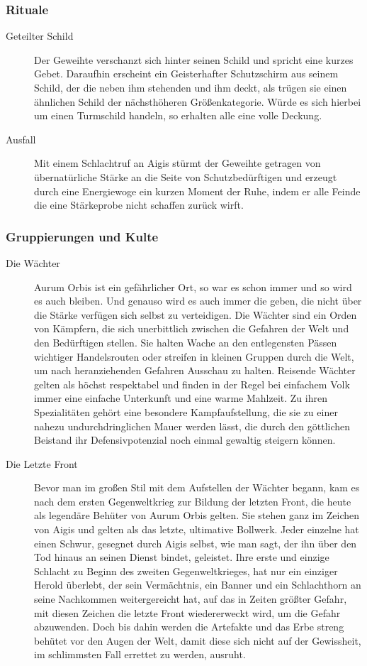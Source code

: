 \documentclass[a4paper,12pt,oneside]{book}
\begin{document}
\subsubsection{Rituale}
\begin{description}
\item[Geteilter Schild]
Der Geweihte verschanzt sich hinter seinen Schild und spricht eine kurzes Gebet. Daraufhin erscheint ein Geisterhafter Schutzschirm aus seinem Schild, der die neben ihm stehenden und ihm deckt, als trügen sie einen ähnlichen Schild der nächsthöheren Größenkategorie. Würde es sich hierbei um einen Turmschild handeln, so erhalten alle eine volle Deckung. 
\item[Ausfall]
Mit einem Schlachtruf an Aigis stürmt der Geweihte getragen von übernatürliche Stärke an die Seite von Schutzbedürftigen und erzeugt durch eine Energiewoge ein kurzen Moment der Ruhe, indem er alle Feinde die eine Stärkeprobe nicht schaffen zurück wirft.

\end{description}
\subsubsection{Gruppierungen und Kulte}
\begin{description}
\item[Die Wächter]
Aurum Orbis ist ein gefährlicher Ort, so war es schon immer und so wird es auch bleiben. Und genauso wird es auch immer die geben, die nicht über die Stärke verfügen sich selbst zu verteidigen. Die Wächter sind ein Orden von Kämpfern, die sich unerbittlich zwischen die Gefahren der Welt und den Bedürftigen stellen. Sie halten Wache an den entlegensten Pässen wichtiger Handelsrouten oder streifen in kleinen Gruppen durch die Welt, um nach heranziehenden Gefahren Ausschau zu halten. Reisende Wächter gelten als höchst respektabel und finden in der Regel bei einfachem Volk immer eine einfache Unterkunft und eine warme Mahlzeit. Zu ihren Spezialitäten gehört eine besondere Kampfaufstellung, die sie zu einer nahezu undurchdringlichen Mauer werden lässt, die durch den göttlichen Beistand ihr Defensivpotenzial noch einmal gewaltig steigern können.
\item[Die Letzte Front]
Bevor man im großen Stil mit dem Aufstellen der Wächter begann, kam es nach dem ersten Gegenweltkrieg zur Bildung der letzten Front, die heute als legendäre Behüter von Aurum Orbis gelten. Sie stehen ganz im Zeichen von Aigis und gelten als das letzte, ultimative Bollwerk. Jeder einzelne hat einen Schwur, gesegnet durch Aigis selbst, wie man sagt, der ihn über den Tod hinaus an seinen Dienst bindet, geleistet. Ihre erste und einzige Schlacht zu Beginn des zweiten Gegenweltkrieges, hat nur ein einziger Herold überlebt, der sein Vermächtnis, ein Banner und ein Schlachthorn an seine Nachkommen weitergereicht hat, auf das in Zeiten größter Gefahr, mit diesen Zeichen die letzte Front wiedererweckt wird, um die Gefahr abzuwenden. Doch bis dahin werden die Artefakte und das Erbe streng behütet vor den Augen der Welt, damit diese sich nicht auf der Gewissheit, im schlimmsten Fall errettet zu werden, ausruht.
\end{description}
\end{document}
